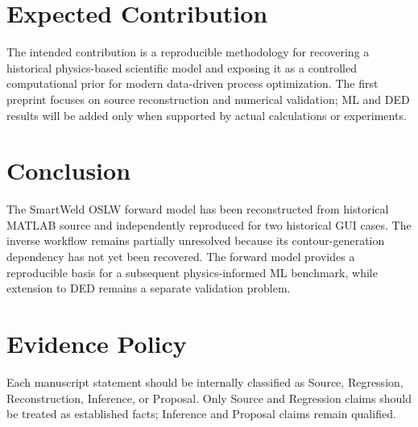 \documentclass[11pt,a4paper]{article}
\begin{document}
\section{Expected Contribution}
The intended contribution is a reproducible methodology for recovering a historical
physics-based scientific model and exposing it as a controlled computational prior
for modern data-driven process optimization. The first preprint focuses on source
reconstruction and numerical validation; ML and DED results will be added only when
supported by actual calculations or experiments.
\section{Conclusion}
The SmartWeld OSLW forward model has been reconstructed from historical MATLAB
source and independently reproduced for two historical GUI cases. The inverse
workflow remains partially unresolved because its contour-generation dependency
has not yet been recovered. The forward model provides a reproducible basis for a
subsequent physics-informed ML benchmark, while extension to DED remains a separate
validation problem.
\appendix
\section{Evidence Policy}
Each manuscript statement should be internally classified as Source, Regression,
Reconstruction, Inference, or Proposal. Only Source and Regression claims should
be treated as established facts; Inference and Proposal claims remain qualified.
\end{document}

